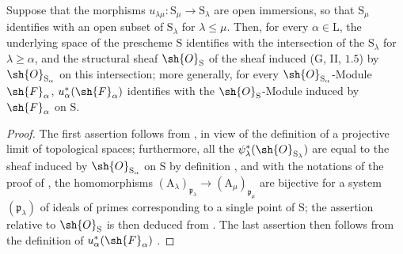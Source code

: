 \begin{proposition}[8.2.13]
\label{IV.8.2.13}
Suppose that the morphisms $u_{\lambda\mu}:\mathrm{S}_\mu\to\mathrm{S}_\lambda$ are open immersions, so that $\mathrm{S}_\mu$ identifies with an open subset of $\mathrm{S}_\lambda$ for $\lambda\leqslant\mu$.
Then, for every $\alpha\in\mathrm{L}$, the underlying space of the prescheme $\mathrm{S}$ identifies with the intersection of the $\mathrm{S}_\lambda$ for $\lambda\geqslant\alpha$, and the structural sheaf $\sh{O}_\mathrm{S}$ of the sheaf induced \textnormal{(}$\mathrm{G}$, II, $1.5$\textnormal{)} by $\sh{O}_{\mathrm{S}_\alpha}$ on this intersection; more generally, for every $\sh{O}_{\mathrm{S}_\alpha}$-Module $\sh{F}_\alpha$, $u_\alpha^*(\sh{F}_\alpha)$ identifies with the $\sh{O}_\mathrm{S}$-Module induced by $\sh{F}_\alpha$ on $\mathrm{S}$.
\end{proposition}

\begin{proof}
The first assertion follows from , in view of the definition of a projective limit of topological spaces; furthermore, all the $\psi_\lambda^*(\sh{O}_{\mathrm{S}_\lambda})$ are equal to the sheaf induced by $\sh{O}_{\mathrm{S}_\alpha}$ on $\mathrm{S}$ by definition , and with the notations of the proof of , the homomorphisms $(\mathrm{A}_\lambda)_{\mathfrak{p}_\lambda}\to(\mathrm{A}_\mu)_{\mathfrak{p}_\mu}$ are bijective for a system $(\mathfrak{p}_\lambda)$ of ideals of primes corresponding to a single point of $\mathrm{S}$; the assertion relative to $\sh{O}_\mathrm{S}$ is then deduced from .
The last assertion then follows from the definition of $u_\alpha^*(\sh{F}_\alpha)$ .
\end{proof}

